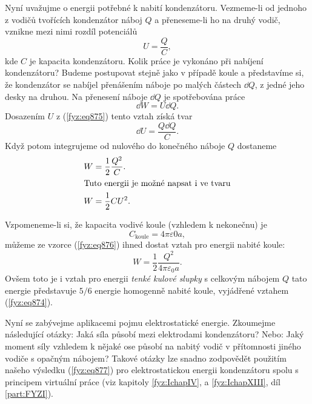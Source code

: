     Nyní uvažujme o energii potřebné k nabití kondenzátoru. Vezmeme-li od jednoho z vodičů tvořících
    kondenzátor náboj \(Q\) a přeneseme-li ho na druhý vodič, vznikne mezi nimi rozdíl potenciálů
    \begin{equation}\label{fyz:eq875}
      U = \dfrac{Q}{C},
    \end{equation}
    kde \(C\) je kapacita kondenzátoru. Kolik práce je vykonáno při nabíjení kondenzátoru? Budeme
    postupovat stejně jako v případě koule a představíme si, že kondenzátor se nabíjel přenášením
    náboje po malých částech \(\dd{Q}\), z jedné jeho desky na druhou. Na přenesení náboje
    \(\dd{Q}\) je spotřebována práce
    \begin{equation*}
      \dd{W} = U\dd{Q}.
    \end{equation*}
    Dosazením \(U\) z (\ref{fyz:eq875}) tento vztah získá tvar
    \begin{equation*}
      \dd{U} = \dfrac{Q\dd{Q}}{C}.
    \end{equation*}
    Když potom integrujeme od nulového do konečného náboje \(Q\) dostaneme
    \begin{align}
      W &= \dfrac{1}{2}\dfrac{Q^2}{C}.  \label{fyz:eq876}     \\
      \shortintertext{Tuto energii je možné napsat i ve tvaru}
      W &= \dfrac{1}{2}CU^2.            \label{fyz:eq877}
    \end{align} 

    Vzpomeneme-li si, že kapacita vodivé koule (vzhledem k nekonečnu) je
    \begin{equation*}
      C_{\text{koule}} = 4π\varepsilon0a,
    \end{equation*}
    můžeme ze vzorce (\ref{fyz:eq876}) ihned dostat vztah pro energii nabité koule:
    \begin{equation}\label{fyz:eq878}
      W=\dfrac{1}{2}\dfrac{Q^2}{4π\varepsilon_0a}.
    \end{equation}
    Ovšem toto je i vztah pro energii \emph{tenké kulové slupky} s celkovým nábojem \(Q\) tato
    energie představuje \(5/6\) energie homogenně nabité koule, vyjádřené vztahem (\ref{fyz:eq874}).

    Nyní se zabývejme aplikacemi pojmu elektrostatické energie. Zkoumejme následující otázky: Jaká
    síla působí mezi elektrodami kondenzátoru? Nebo: Jaký moment síly vzhledem k nějaké ose působí
    na nabitý vodič v přítomnosti jiného vodiče s opačným nábojem? Takové otázky lze snadno
    zodpovědět použitím našeho výsledku (\ref{fyz:eq877}) pro elektrostatickou energii kondenzátoru
    spolu s principem virtuální práce (viz kapitoly \ref{fyz:IchapIV}, a \ref{fyz:IchapXIII},
    díl \ref{part:FYZI}).


